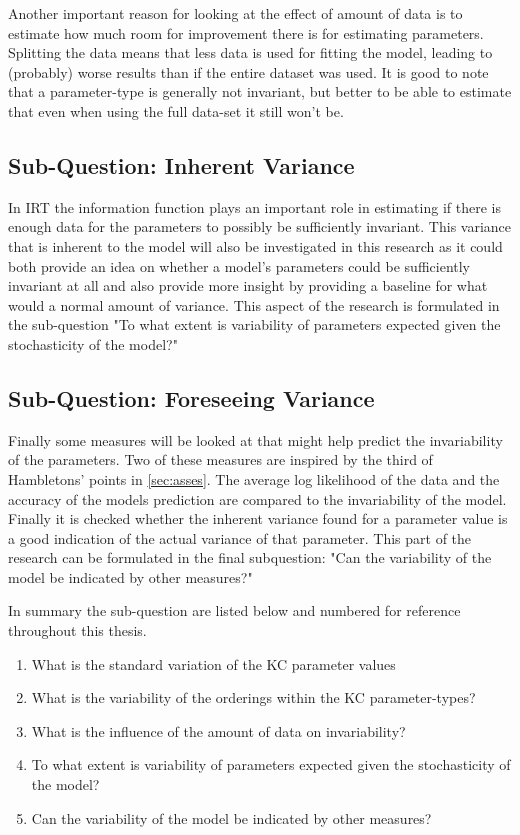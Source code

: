 \documentclass{scrartcl}
\begin{document}
Another important reason for looking at the effect of amount of data is to estimate how much room for improvement there is for estimating parameters. Splitting the data means that less data is used for fitting the model, leading to (probably) worse results than if the entire dataset was used. It is good to note that a parameter-type is generally not invariant, but better to be able to estimate that even when using the full data-set it still won't be.

\subsection{Sub-Question: Inherent Variance}
In IRT the information function plays an important role in estimating if there is enough data for the parameters to possibly be sufficiently invariant. This variance that is inherent to the model will also be investigated in this research as it could both provide an idea on whether a model's parameters could be sufficiently invariant at all and also provide more insight by providing a baseline for what would a normal amount of variance. This aspect of the research is formulated in the sub-question "To what extent is variability of parameters expected given the stochasticity of the model?"

\subsection{Sub-Question: Foreseeing Variance}
Finally some measures will be looked at that might help predict the invariability of the parameters. Two of these measures are inspired by the third of Hambletons' points in \ref{sec:asses}. The average log likelihood of the data and the accuracy of the models prediction are compared to the invariability of the model. Finally it is checked whether the inherent variance found for a parameter value is a good indication of the actual variance of that parameter. This part of the research can be formulated in the final subquestion: "Can the variability of the model be indicated by other measures?"

In summary the sub-question are listed below and numbered for reference throughout this thesis.
\begin{enumerate}
  \item What is the standard variation of the KC parameter values
  \item What is the variability of the orderings within the KC parameter-types?
  \item What is the influence of the amount of data on invariability?
  \item To what extent is variability of parameters expected given the stochasticity of the model?
  \item Can the variability of the model be indicated by other measures?
\end{enumerate}
\end{document}
